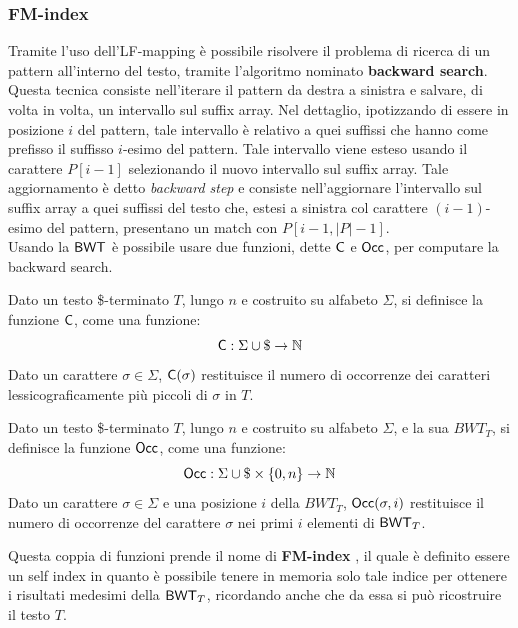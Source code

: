 \subsubsection{FM-index}
Tramite l'uso dell'LF-mapping è possibile risolvere il problema di
ricerca di un pattern all'interno del testo, tramite l'algoritmo nominato
\textbf{backward search}. Questa tecnica consiste nell'iterare il pattern da
destra a sinistra e
salvare, di volta in volta, un intervallo sul suffix array. Nel
dettaglio, ipotizzando di essere in posizione $i$ del pattern, tale
intervallo è relativo a quei suffissi che hanno come prefisso il suffisso
$i$-esimo del pattern. Tale intervallo viene esteso usando il carattere
$P[i-1]$ selezionando il nuovo intervallo sul suffix array. Tale
aggiornamento è detto \textit{backward step} e consiste nell'aggiornare
l'intervallo sul suffix array a quei suffissi del testo che, estesi a sinistra
col carattere $(i-1)$-esimo del pattern, presentano un match con $P[i-1,
|P|-1]$.\\   
Usando la $\mbox{\rm {\sf BWT}}$ è possibile usare due funzioni, dette $\mbox{\rm {\sf C}}$ e $\mbox{\rm {\sf Occ}}$, per
computare la backward search.
\begin{definizione}
  Dato un testo \$-terminato $T$, lungo $n$ e costruito su alfabeto $\Sigma$, si
  definisce la funzione $\mbox{\rm {\sf C}}$, come una funzione:
  \begin{equation}
    \label{eq:bwt4}
    \mbox{\rm {\sf C}}:\Sigma\cup \$\to \mathbb{N}
  \end{equation}
  Dato un carattere $\sigma\in\Sigma$, $\mbox{\rm {\sf C}}(\sigma)$ restituisce il
  numero di 
  occorrenze dei caratteri lessicograficamente più piccoli di $\sigma$ in $T$.
\end{definizione}
\begin{definizione}
  Dato un testo \$-terminato $T$, lungo $n$ e costruito su alfabeto $\Sigma$, e
  la sua $BWT_T$, si definisce la funzione $\mbox{\rm {\sf Occ}}$, come una funzione:
  \begin{equation}
    \label{eq:bwt5}
    \mbox{\rm {\sf Occ}}:\Sigma\cup \$\times \{0,n\}\to \mathbb{N}
  \end{equation}
  Dato un carattere $\sigma\in\Sigma$ e una posizione $i$ della
  $BWT_T$, $\mbox{\rm {\sf Occ}}(\sigma,i)$ restituisce il numero di occorrenze del carattere
  $\sigma$ nei primi $i$ elementi di $\mbox{\rm {\sf BWT}}_T$.
\end{definizione}
Questa coppia di funzioni prende il nome di \textbf{FM-index} \cite{fm}, il
quale è definito essere un self index in quanto è possibile tenere in
memoria solo tale indice per ottenere i risultati medesimi della $\mbox{\rm {\sf BWT}}_T$,
ricordando anche che da essa si può ricostruire il testo $T$.
